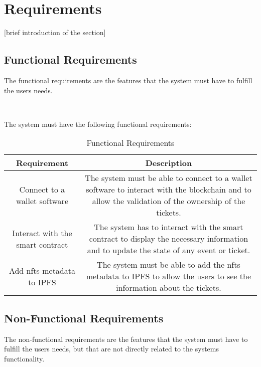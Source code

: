 \section{Requirements}
\label{sec:requirements}

[brief introduction of the section]


\subsection{Functional Requirements}
\label{subsec:functional_requirements}

The functional requirements are the features that the system must have to fulfill the users needs.

~

The system must have the following functional requirements:

\begin{table}[H]
    \caption{Functional Requirements}
    \label{tab:functional_requirements}
    \begin{tabular}{|c|c|}
        \hline
        \textbf{Requirement}             & \textbf{Description}                                                                                                                                 \\
        \hline
        Connect to a wallet software     & The system must be able to connect to a wallet software to interact with the blockchain and to allow the validation of the ownership of the tickets. \\
        \hline
        Interact with the smart contract & The system has to interact with the smart contract to display the necessary information and to update the state of any event or ticket.              \\
        \hline
        Add nfts metadata to IPFS        & The system must be able to add the nfts metadata to IPFS to allow the users to see the information about the tickets.                                \\
        \hline
    \end{tabular}
\end{table}


\subsection{Non-Functional Requirements}
\label{subsec:non_functional_requirements}

The non-functional requirements are the features that the system must have to fulfill the users needs, but that are not directly related to the systems functionality.

